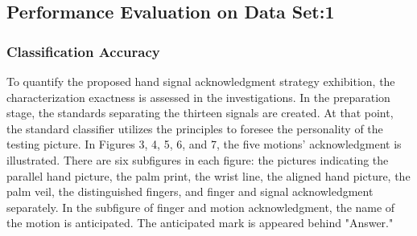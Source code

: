 \documentclass[a4paper]{article}
\begin{document}
\subsection{Performance Evaluation on Data Set:1}

\subsubsection{Classification Accuracy}
To quantify the proposed hand signal acknowledgment strategy exhibition, the characterization exactness is assessed in the investigations. In the preparation stage, the standards separating the thirteen signals are created. At that point, the standard classifier utilizes the principles to foresee the personality of the testing picture. In Figures 3, 4, 5, 6, and 7, the five motions' acknowledgment is illustrated. There are six subfigures in each figure: the pictures indicating the parallel hand picture, the palm print, the wrist line, the aligned hand picture, the palm veil, the distinguished fingers, and finger and signal acknowledgment separately. In the subfigure of finger and motion acknowledgment, the name of the motion is anticipated. The anticipated mark is appeared behind "Answer."
\end{document}
